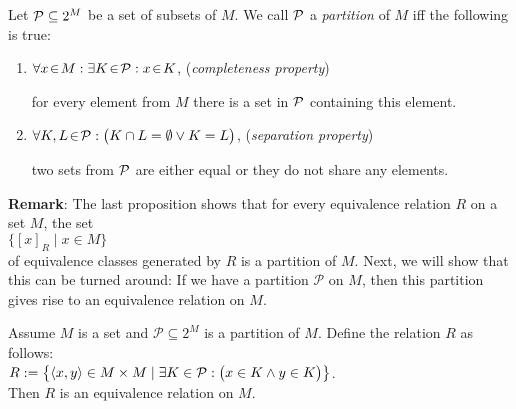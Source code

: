 \begin{Definition}[Partition] 
Let  ${\cal P} \subseteq 2^M$ be a set of subsets of $M$.  We call  ${\cal P}$ a
\emph{partition} of  $M$ iff the following is true:
\begin{enumerate}
\item $\forall x \!\in\! M : \exists K \!\in\! {\cal P} : x \!\in\! K$, \hspace*{\fill}  (\emph{completeness property})

      for every element from $M$ there is a set in ${\cal P}$ containing this element.
\item $\forall K, L \!\in\! {\cal P} : \bigl(K \cap L =\emptyset \vee K = L\bigr)$, \hspace*{\fill}
      (\emph{separation property})
      
      two sets from ${\cal P}$ are either equal or they do not share any elements.
\end{enumerate}
\end{Definition}

\noindent
\textbf{Remark}:
The last  proposition shows that for every equivalence relation $R$ on a set $M$, 
the set
\\[0.2cm]
\hspace*{1.3cm}
$\bigl\{ [x]_R \mid x \in M \bigr\}$
\\[0.2cm]
of equivalence classes generated by $R$ is a partition of $M$.  
Next, we will show that this can be turned around: If we have a partition $\mathcal{P}$ on
$M$, then this partition gives rise to an equivalence relation on $M$.

\begin{Proposition} 
Assume  $M$ is a set and $\mathcal{P} \subseteq 2^M$ is a partition of $M$.  Define the
relation $R$ as follows:
\\[0.2cm]
\hspace*{1.3cm}
$R := \bigl\{ \pair(x,y) \in M \times M \mid \exists K \in \mathcal{P}: \bigl(x \in K \wedge y \in K\bigr) \bigr\}$.
\\[0.2cm]
Then $R$ is an equivalence relation on $M$.
\end{Proposition}

